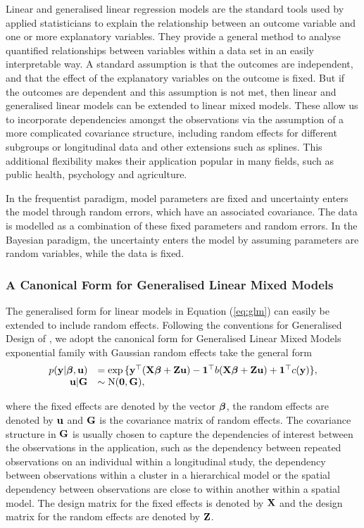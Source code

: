 Linear and generalised linear regression models are the standard tools used by
applied statisticians to explain the relationship between an outcome variable
and one or more explanatory variables. They provide a general method  to analyse
quantified relationships between variables within a data set in an easily
interpretable way. A standard assumption is that the outcomes are independent,
and that the effect of the explanatory variables on the outcome is fixed. But if
the outcomes are dependent and this assumption is not met, then linear and
generalised linear models can be extended to linear mixed models. These allow us
to incorporate dependencies amongst the  observations via the assumption of a
more complicated covariance structure, including random effects for  different
subgroups or longitudinal data and other extensions such as splines. This
additional flexibility makes their application popular in many fields, such as
public health, psychology and agriculture.

In the frequentist paradigm, model parameters are fixed and uncertainty enters
the model through random errors, which have an associated covariance. The data
is modelled as a combination of these fixed parameters and random errors. In the
Bayesian paradigm, the uncertainty enters the model by assuming parameters are
random variables, while the data is fixed.

\subsubsection{A Canonical Form for Generalised Linear Mixed Models}

The generalised form for linear models in Equation (\ref{eq:glm}) can easily be
extended to include random effects.  Following the conventions for Generalised
Design of \citep{Zhao2006}, we adopt the canonical form for Generalised Linear
Mixed Models exponential family with Gaussian random effects take the general
form
$$
\begin{array}{rl}\label{eq:glmm}
	p({\bf y} | {\boldsymbol \beta}, {\bf u}) &= \exp{\{ {\bf y}^\top ({\bf X}{\boldsymbol\beta}+ {\bf Z}{\bf u}) - {\bf1}^\top b({\bf X}{\boldsymbol\beta}+ {\bf Z}{\bf u}) + {\bf1}^\top c({\bf y}) \}}, \\
	{\bf u} | {\bf G} &\sim \text{N}({\bf 0}, {\bf G}),
\end{array}
$$

where the fixed effects are denoted by the vector ${\boldsymbol \beta}$, the random effects
are denoted by ${\bf u}$ and ${\bf G}$ is the covariance matrix of random effects. The
covariance structure in ${\bf G}$ is usually chosen to capture the dependencies of
interest between the observations in the application, such as the dependency
between repeated observations on an individual within a longitudinal study, the
dependency between observations within a cluster in a hierarchical model or the
spatial dependency between observations are close to within another within a
spatial model. The design matrix for the fixed effects is denoted by ${\bf X}$ and
the design matrix for the random effects are denoted by ${\bf Z}$.

